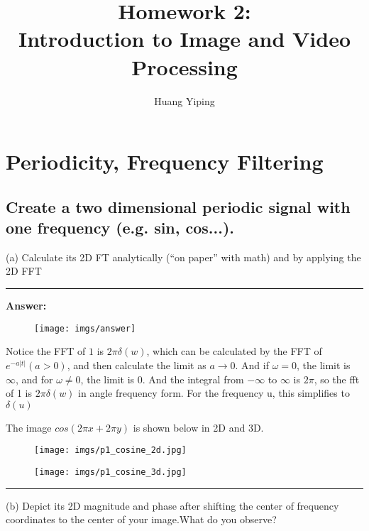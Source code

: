 \documentclass[conference]{styles/acmsiggraph}
\title{\huge Homework 2: \\ \LARGE {Introduction to Image and Video Processing}}
\author{\Large Huang Yiping \\}
\newenvironment{answer}{}{}
\begin{document}
\maketitle


\section{Periodicity, Frequency Filtering}

\subsection{Create a two dimensional periodic signal with one frequency (e.g. sin, cos...).}
(a) Calculate its 2D FT analytically (“on paper” with math) and by applying the 2D FFT

\begin{answer}
	\rule{\textwidth}{0.4pt}
	
	\textbf{Answer:}
	\begin{figure}[H]
	\centering
	\texttt{[image: imgs/answer]}
	\end{figure}	
	Notice the FFT of $1$ is $2\pi\delta(w) $, which can be calculated by the FFT of $e^{-a|t|} (a>0)$, and then calculate the limit as $a\rightarrow0$. And if $\omega = 0$, the limit is $\infty$, and for $\omega \neq 0$, the limit is 0. And the integral from $-\infty$ to $\infty$ is $2\pi$, so the fft of 1 is $2\pi\delta(w)$ in angle frequency form. For the frequency u, this simplifies to $\delta(u)$

	The image $cos(2\pi x + 2\pi y)$ is shown below in 2D and 3D.
	\begin{figure}[H]
		\centering
		\texttt{[image: imgs/p1\_cosine\_2d.jpg]}
		\end{figure}	
		\begin{figure}[H]
		\centering
		\texttt{[image: imgs/p1\_cosine\_3d.jpg]}
    \label{fig:p1_cosine_3d}
		\end{figure}	

\rule{\textwidth}{0.4pt}
\end{answer}

(b) Depict its 2D magnitude and phase after shifting the center of frequency coordinates to the
center of your image.What do you observe?
\end{document}
